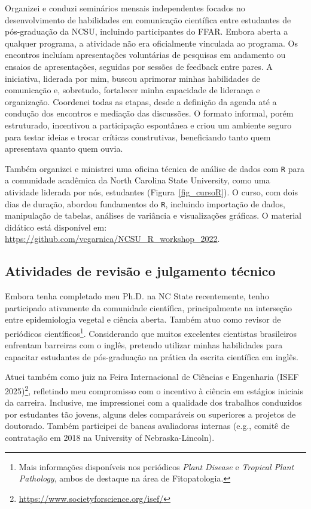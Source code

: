 \documentclass[12pt,a4paper,oneside]{book}
\newcommand{\UNL}{University of Nebraska-Lincoln}
\newcommand{\NCState}{North Carolina State University}
\begin{document}
Organizei e conduzi seminários mensais independentes focados no desenvolvimento de habilidades em comunicação científica 
entre estudantes de pós-graduação da NCSU, incluindo participantes do FFAR. Embora aberta a qualquer programa, a atividade 
não era oficialmente vinculada ao programa. Os encontros incluíam apresentações voluntárias de pesquisas em andamento ou 
ensaios de apresentações, seguidas por sessões de feedback entre pares. A iniciativa, liderada por mim, buscou aprimorar 
minhas habilidades de comunicação e, sobretudo, fortalecer minha capacidade de liderança e organização. Coordenei todas as 
etapas, desde a definição da agenda até a condução dos encontros e mediação das discussões. O formato informal, porém 
estruturado, incentivou a participação espontânea e criou um ambiente seguro para testar ideias e trocar críticas 
construtivas, beneficiando tanto quem apresentava quanto quem ouvia.

Também organizei e ministrei uma oficina técnica de análise de dados com \texttt{R} para a comunidade acadêmica da \NCState{},
como uma atividade liderada por nós, estudantes (Figura~\ref{fig_cursoR}). O curso, com dois dias de duração, abordou 
fundamentos do \texttt{R}, incluindo importação de dados, 
manipulação de tabelas, análises de variância e visualizações gráficas. O material didático está disponível 
em: \url{https://github.com/vcgarnica/NCSU_R_workshop_2022}.

\subsection{Atividades de revisão e julgamento técnico}

Embora tenha completado meu Ph.D. na NC State recentemente, tenho participado ativamente da comunidade 
científica, principalmente na interseção entre epidemiologia vegetal e ciência aberta. Também atuo como revisor de periódicos 
científicos\footnote{Mais informações disponíveis nos periódicos \textit{Plant Disease} e \textit{Tropical Plant Pathology}, 
ambos de destaque na área de Fitopatologia.}. Considerando que muitos excelentes cientistas 
brasileiros enfrentam barreiras com o inglês, pretendo utilizar minhas habilidades para 
capacitar estudantes de pós-graduação na prática da escrita científica em inglês.

Atuei também como juiz na Feira Internacional de Ciências e Engenharia (ISEF 2025)\footnote{\url{https://www.societyforscience.org/isef/}}, 
refletindo meu compromisso com o incentivo à ciência em estágios iniciais da carreira. Inclusive, 
me impressionei com a qualidade dos trabalhos conduzidos por estudantes tão jovens, alguns deles 
comparáveis ou superiores a projetos de doutorado. Também participei de bancas avaliadoras 
internas (e.g., comitê de contratação em 2018 na \UNL{}).
\end{document}
